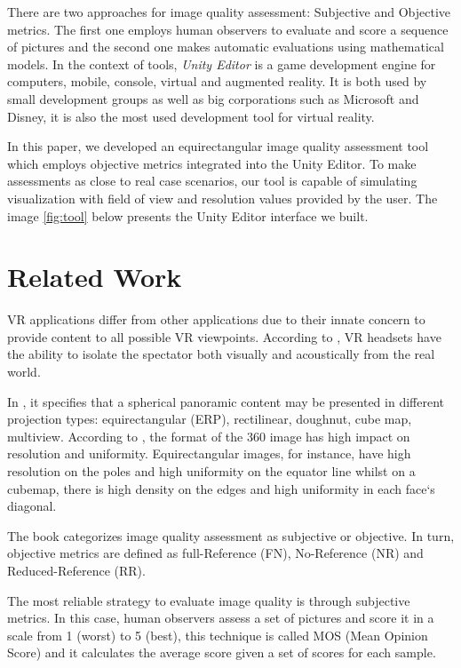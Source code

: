 \documentclass[12pt]{article}
\begin{document}
There are two approaches for image quality assessment: Subjective  and Objective metrics. The first one employs human observers to evaluate and score a sequence of pictures and the second one makes automatic evaluations using mathematical models. In the context of tools, \textit{Unity Editor} is a game development engine for computers, mobile, console, virtual and augmented reality. It is both used by small development groups as well as big corporations such as Microsoft and Disney, it is also the most used development tool for virtual reality.

In this paper, we developed an equirectangular image quality assessment tool which employs objective metrics integrated into the Unity Editor. To make assessments as close to real case scenarios, our tool is capable of simulating visualization with field of view and resolution values provided by the user. The image \ref{fig:tool} below presents the Unity Editor interface we built.

\section{Related Work}
VR applications differ from other applications due to their innate concern to provide content to all possible VR viewpoints. According to \cite{fuchs2017virtual}, VR headsets have the ability to isolate the spectator both visually and acoustically from the real world.

In \cite{zakharchenko2016quality}, it specifies that a spherical panoramic content may be presented in different projection types: equirectangular (ERP), rectilinear, doughnut, cube map, multiview. According to \cite{dunn2017resolution}, the format of the 360 image has high impact on resolution and uniformity. Equirectangular images, for instance, have high resolution on the poles and high uniformity on the equator line whilst on a cubemap, there is high density on the edges and high uniformity in each face`s diagonal.

The book \cite{wang2006modern} categorizes image quality assessment as subjective or objective. In turn, objective metrics are defined as full-Reference (FN), No-Reference (NR) and Reduced-Reference (RR).

The most reliable strategy to evaluate image quality is through subjective metrics. In this case, human observers assess a set of pictures and score it in a scale from 1 (worst) to 5 (best), this technique is called MOS (Mean Opinion Score) and it calculates the average score given a set of scores for each sample.
\end{document}
